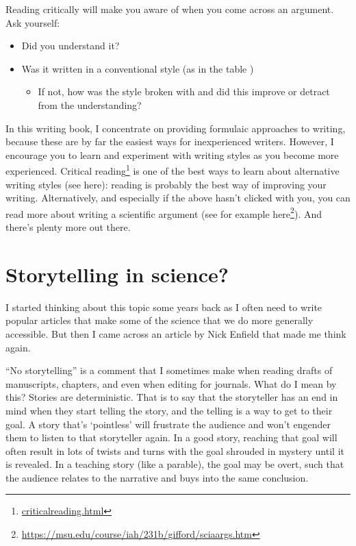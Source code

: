 \documentclass[
]{krantz}
\providecommand{\tightlist}{%
  \setlength{\itemsep}{0pt}\setlength{\parskip}{0pt}}
\renewcommand{\href}[2]{#2\footnote{\url{#1}}}
\begin{document}
Reading critically will make you aware of when you come across an argument. Ask yourself:

\begin{itemize}
\tightlist
\item
  Did you understand it?
\item
  Was it written in a conventional style (as in the table \label{tab:argument})

  \begin{itemize}
  \tightlist
  \item
    If not, how was the style broken with and did this improve or detract from the understanding?
  \end{itemize}
\end{itemize}

In this writing book, I concentrate on providing formulaic approaches to writing, because these are by far the easiest ways for inexperienced writers. However, I encourage you to learn and experiment with writing styles as you become more experienced. \href{criticalreading.html}{Critical reading} is one of the best ways to learn about alternative writing styles (see here): reading is probably the best way of improving your writing. Alternatively, and especially if the above hasn't clicked with you, you can read more about writing a scientific argument (see for example \href{https://msu.edu/course/iah/231b/gifford/sciaargs.htm}{here}). And there's plenty more out there.

\hypertarget{storytelling}{%
\section{Storytelling in science?}\label{storytelling}}

I started thinking about this topic some years back as I often need to write popular articles that make some of the science that we do more generally accessible. But then I came across an article by Nick Enfield \citeyearpar{enfield2018our} that made me think again.

``No storytelling'' is a comment that I sometimes make when reading drafts of manuscripts, chapters, and even when editing for journals. What do I mean by this? Stories are deterministic. That is to say that the storyteller has an end in mind when they start telling the story, and the telling is a way to get to their goal. A story that's `pointless' will frustrate the audience and won't engender them to listen to that storyteller again. In a good story, reaching that goal will often result in lots of twists and turns with the goal shrouded in mystery until it is revealed. In a teaching story (like a parable), the goal may be overt, such that the audience relates to the narrative and buys into the same conclusion.
\end{document}
